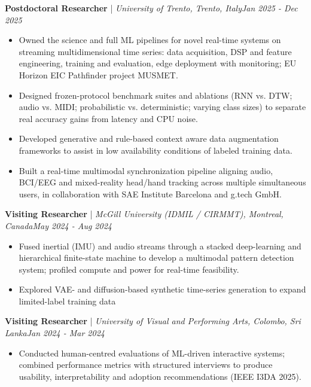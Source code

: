 \documentclass[11pt]{article}
\newenvironment{cvrole}[5]{%
  \par\noindent\textbf{\large #1} | \textit{\small #2, #3}\hfill \textit{\small #4 - #5}\par
  \begin{itemize}[leftmargin=2em, itemsep=-0.3em, topsep=-0.5em]%
}{%
  \end{itemize}\par\noindent\mbox{}\par\vspace{0.1em}%
}
\begin{document}
\begin{cvrole}{Postdoctoral Researcher}{University of Trento}{Trento, Italy}{Jan 2025}{Dec 2025}
    \item Owned the science and full ML pipelines for novel real-time systems on streaming multidimensional time series: data acquisition, DSP and feature engineering, training and evaluation, edge deployment with monitoring; EU Horizon EIC Pathfinder project MUSMET.
    \item Designed frozen-protocol benchmark suites and ablations (RNN vs. DTW; audio vs. MIDI; probabilistic vs. deterministic; varying class sizes) to separate real accuracy gains from latency and CPU noise.
    \item Developed generative and rule-based context aware data augmentation frameworks to assist in low availability conditions of labeled training data. 
    \item Built a real-time multimodal synchronization pipeline aligning audio, BCI/EEG and mixed-reality head/hand tracking across multiple simultaneous users, in collaboration with SAE Institute Barcelona and g.tech GmbH.
\end{cvrole}

\begin{cvrole}{Visiting Researcher}{McGill University (IDMIL / CIRMMT)}{Montreal, Canada}{May 2024}{Aug 2024}
    \item Fused inertial (IMU) and audio streams through a stacked deep-learning and hierarchical finite-state machine to develop a multimodal pattern detection system; profiled compute and power for real-time feasibility.
    \item Explored VAE- and diffusion-based synthetic time-series generation to expand limited-label training data

\end{cvrole}

\begin{cvrole}{Visiting Researcher}{University of Visual and Performing Arts}{Colombo, Sri Lanka}{Jan 2024}{Mar 2024}
    \item Conducted human-centred evaluations of ML-driven interactive systems; combined performance metrics with structured interviews to produce usability, interpretability and adoption recommendations (IEEE I3DA 2025).
\end{cvrole}
\end{document}

